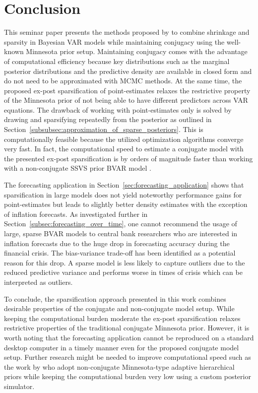 \section{Conclusion}
\label{sec:conclusion}
This seminar paper presents the methods proposed by \textcite{hauzenberger_combining_2021} to combine shrinkage and sparsity in Bayesian VAR models while maintaining conjugacy using the well-known Minnesota prior setup. Maintaining conjugacy comes with the advantage of computational efficiency because key distributions such as the marginal posterior distributions and the predictive density are available in closed form and do not need to be approximated with MCMC methods. At the same time, the proposed ex-post sparsification of point-estimates relaxes the restrictive property of the Minnesota prior of not being able to have different predictors across VAR equations. The drawback of working with point-estimates only is solved by drawing and sparsifying repeatedly from the posterior as outlined in Section~\ref{subsubsec:approximation_of_sparse_posteriors}. This is computationally feasible because the utilized optimization algorithms converge very fast. In fact, the computational speed to estimate a conjugate model with the presented ex-post sparsification is by orders of magnitude faster than working with a non-conjugate SSVS prior BVAR model \parencite[Online Appendix]{hauzenberger_combining_2021}.

The forecasting application in Section~\ref{sec:forecasting_application} shows that sparsification in large models does not yield noteworthy performance gains for point-estimates but leads to slightly better density estimates with the exception of inflation forecasts. As investigated further in Section~\ref{subsec:forecasting_over_time}, one cannot recommend the usage of large, sparse BVAR models to central bank researchers who are interested in inflation forecasts due to the huge drop in forecasting accuracy during the financial crisis. The bias-variance trade-off has been identified as a potential reason for this drop. A sparse model is less likely to capture outliers due to the reduced predictive variance and performs worse in times of crisis which can be interpreted as outliers.

To conclude, the sparsification approach presented in this work combines desirable properties of the conjugate and non-conjugate model setup. While keeping the computational burden moderate the ex-post sparsification relaxes restrictive properties of the traditional conjugate Minnesota prior. However, it is worth noting that the forecasting application cannot be reproduced on a standard desktop computer in a timely manner even for the proposed conjugate model setup. Further research might be needed to improve computational speed such as the work by \textcite{chan_minnesota-type_2019} who adopt non-conjugate Minnesota-type adaptive hierarchical priors while keeping the computational burden very low using a custom posterior simulator.
